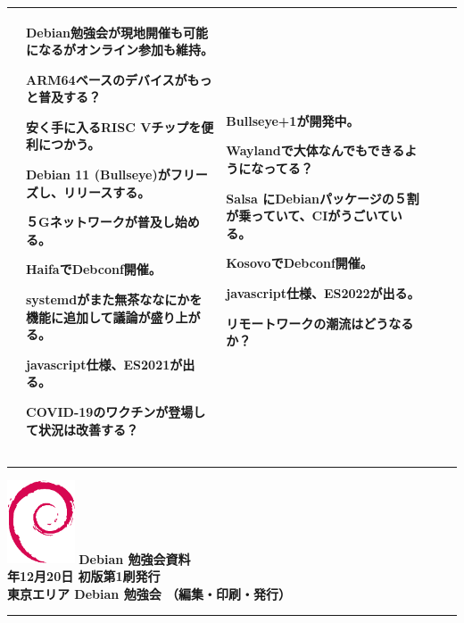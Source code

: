 \documentclass[mingoth,a4paper]{jsarticle}
\newcommand{\debmtgyear}{2020}
\newcommand{\debmtgmonth}{12}
\newcommand{\debmtgdate}{20}
\begin{document}
{\begin{tabular}[t]{|p{8em}|p{8em}|p{8em}|p{8em}|p{8em}|}
&

Debian勉強会が現地開催も可能になるがオンライン参加も維持。

ARM64ベースのデバイスがもっと普及する？

安く手に入るRISC Vチップを便利につかう。

Debian 11 (Bullseye)がフリーズし、リリースする。

５Gネットワークが普及し始める。

HaifaでDebconf開催。

systemdがまた無茶ななにかを機能に追加して議論が盛り上がる。

javascript仕様、ES2021が出る。

COVID-19のワクチンが登場して状況は改善する？

&

Bullseye+1が開発中。

Waylandで大体なんでもできるようになってる？

Salsa にDebianパッケージの５割が乗っていて、CIがうごいている。

KosovoでDebconf開催。

javascript仕様、ES2022が出る。

リモートワークの潮流はどうなるか？

\\

\hline
\end{tabular}
}

\printindex


\vspace*{15cm}
\hrule
\vspace{2mm}
\includegraphics[width=2cm]{image200502/openlogo-nd.eps}
\noindent \Large \bf Debian 勉強会資料\\
\noindent \normalfont \debmtgyear{}年\debmtgmonth{}月\debmtgdate{}日 \hspace{5mm}  初版第1刷発行\\
\noindent \normalfont 東京エリア Debian 勉強会 （編集・印刷・発行）\\
\hrule
\end{document}
